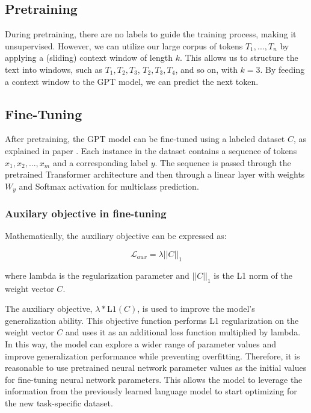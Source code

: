 \documentclass[
	11pt,
	a4paper,
	figtabcapt,
]{oblivoir}
\begin{document}
\subsection{Pretraining}
During pretraining, there are no labels to guide the training process, making it unsupervised.
However, we can utilize our large corpus of tokens $T_1, ..., T_n$ by applying a (sliding) context window of length $k$.
This allows us to structure the text into windows, such as $T_1, T_2, T_3$, $T_2, T_3, T_4$, and so on, with $k=3$.
By feeding a context window to the GPT model, we can predict the next token.


\subsection{Fine-Tuning}
After pretraining, the GPT model can be fine-tuned using a labeled dataset $C$,
as explained in paper \cite{radford2018improving}.
Each instance in the dataset contains a sequence of tokens $x_1, x_2, ..., x_m$ and a corresponding label $y$.
The sequence is passed through the pretrained Transformer architecture
and then through a linear layer with weights $W_y$ and Softmax activation for multiclass prediction.

\subsubsection{Auxilary objective in fine-tuning}
Mathematically, the auxiliary objective can be expressed as:

\begin{equation}
\mathcal{L}_{aux} = \lambda ||C||_1
\end{equation}

where lambda is the regularization parameter and $||C||_1$ is the L1 norm of the weight vector $C$.

The auxiliary objective, $\lambda * \text{L1}(C)$, is used to improve the model's generalization ability.
This objective function performs L1 regularization on the weight vector $C$
and uses it as an additional loss function multiplied by lambda.
In this way, the model can explore a wider range of parameter values
and improve generalization performance while preventing overfitting.
Therefore, it is reasonable to use pretrained neural network parameter values
as the initial values for fine-tuning neural network parameters.
This allows the model to leverage the information from the previously learned language model
to start optimizing for the new task-specific dataset. 


\clearpage
\end{document}
